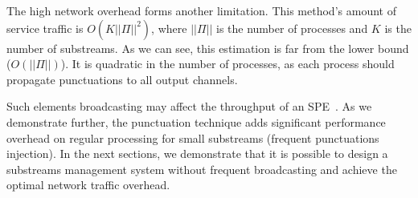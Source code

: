 The high network overhead forms another limitation. This method's amount of service traffic is $O(K||\Pi||^2)$, where $||\Pi||$ is the number of processes and $K$ is the number of substreams. As we can see, this estimation is far from the lower bound ($O(||\Pi||)$). It is quadratic in the number of processes, as each process should propagate punctuations to all output channels. 

Such elements broadcasting may affect the throughput of an SPE~\cite{Li:2008:OPN:1453856.1453890}. As we demonstrate further, the punctuation technique adds significant performance overhead on regular processing for small substreams (frequent punctuations injection). In the next sections, we demonstrate that it is possible to design a substreams management system without frequent broadcasting and achieve the optimal network traffic overhead.
